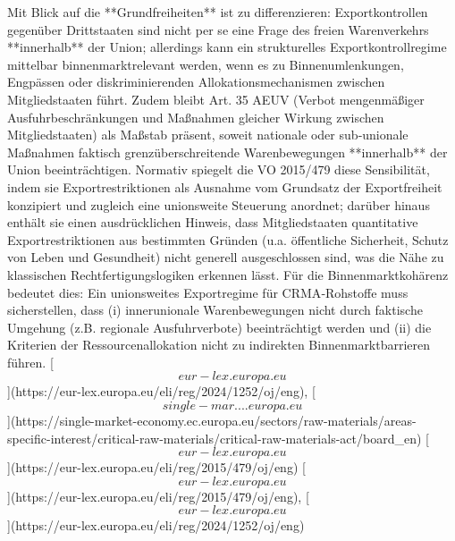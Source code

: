 \documentclass[12pt,a4paper,oneside]{book} %
\begin{document}
Mit Blick auf die **Grundfreiheiten** ist zu differenzieren: Exportkontrollen gegenüber Drittstaaten sind nicht per se eine Frage des freien Warenverkehrs **innerhalb** der Union; allerdings kann ein strukturelles Exportkontrollregime mittelbar binnenmarktrelevant werden, wenn es zu Binnenumlenkungen, Engpässen oder diskriminierenden Allokationsmechanismen zwischen Mitgliedstaaten führt.  Zudem bleibt Art. 35 AEUV (Verbot mengenmäßiger Ausfuhrbeschränkungen und Maßnahmen gleicher Wirkung zwischen Mitgliedstaaten) als Maßstab präsent, soweit nationale oder sub‑unionale Maßnahmen faktisch grenzüberschreitende Warenbewegungen **innerhalb** der Union beeinträchtigen. Normativ spiegelt die VO 2015/479 diese Sensibilität, indem sie Exportrestriktionen als Ausnahme vom Grundsatz der Exportfreiheit konzipiert und zugleich eine unionsweite Steuerung anordnet; darüber hinaus enthält sie einen ausdrücklichen Hinweis, dass Mitgliedstaaten quantitative Exportrestriktionen aus bestimmten Gründen (u.a. öffentliche Sicherheit, Schutz von Leben und Gesundheit) nicht generell ausgeschlossen sind, was die Nähe zu klassischen Rechtfertigungslogiken erkennen lässt.  Für die Binnenmarktkohärenz bedeutet dies: Ein unionsweites Exportregime für CRMA‑Rohstoffe muss sicherstellen, dass (i) innerunionale Warenbewegungen nicht durch faktische Umgehung (z.B. regionale Ausfuhrverbote) beeinträchtigt werden und (ii) die Kriterien der Ressourcenallokation nicht zu indirekten Binnenmarktbarrieren führen. [\[eur-lex.europa.eu\]](https://eur-lex.europa.eu/eli/reg/2024/1252/oj/eng), [\[single-mar....europa.eu\]](https://single-market-economy.ec.europa.eu/sectors/raw-materials/areas-specific-interest/critical-raw-materials/critical-raw-materials-act/board_en) [\[eur-lex.europa.eu\]](https://eur-lex.europa.eu/eli/reg/2015/479/oj/eng) [\[eur-lex.europa.eu\]](https://eur-lex.europa.eu/eli/reg/2015/479/oj/eng), [\[eur-lex.europa.eu\]](https://eur-lex.europa.eu/eli/reg/2024/1252/oj/eng)
\end{document}
